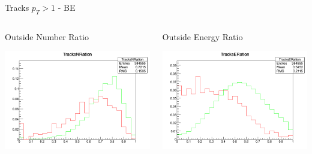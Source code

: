 \documentclass[8pt]{beamer}
\begin{document}
\begin{frame}{Tracks $p_T>1$ - BE}

\begin{columns}
 
\begin{block}{Outside Number Ratio}
 
\includegraphics[width=\linewidth]{img/BE_Tracks1_TracksNRatio.png}

\end{block}

\begin{block}{Outside Energy Ratio}
 
\includegraphics[width=\linewidth]{img/BE_Tracks1_TracksERatio.png}
 
\end{block}

\end{columns}

\end{frame}
\end{document}
